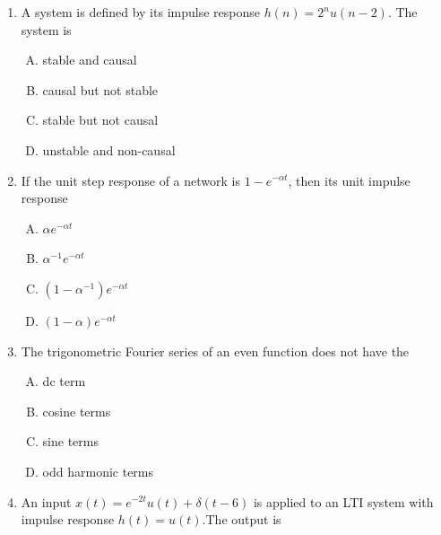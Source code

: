 \documentclass[journal,12pt,twocolumn]{IEEEtran}
\begin{document}
\begin{enumerate}
\item A system is defined by its impulse response $h(n)=2^{n}u(n-2)$. The system is

\begin{enumerate}[(A)]
\setlength\itemsep{2em}

\item stable and causal
\item causal but not stable
\item stable but not causal
\item unstable and non-causal
\end{enumerate}

\item If the unit step response of a network is $1-e^{-\alpha t}$, then its unit impulse response

\begin{enumerate}[(A)]
\setlength\itemsep{2em}

\item $\alpha e^{-\alpha t}$
\item $\alpha^{-1} e^{-\alpha t}$
\item $(1-\alpha^{-1}) e^{-\alpha t}$
\item $(1-\alpha) e^{-\alpha t}$
\end{enumerate}

\item The trigonometric Fourier series of an even function does not have the
\begin{enumerate}[(A)]
\setlength\itemsep{2em}

\item dc term
\item cosine terms
\item sine terms
\item odd harmonic terms
\end{enumerate}

\item An input $x(t)=e^{-2t}u(t)+\delta(t-6)$ is applied to an LTI system with impulse response $h(t)=u(t)$.The output is
\begin{enumerate}[(A)]
\setlength\itemsep{2em}


\end{enumerate}
\end{enumerate}
\end{document}
